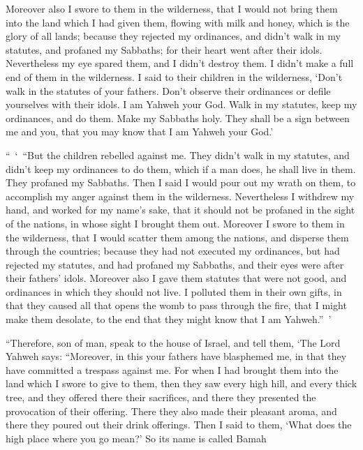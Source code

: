 {Moreover also I swore to them in the wilderness, that I would not bring them into the land which I had given them, flowing with milk and honey, which is the glory of all lands;
because they rejected my ordinances, and didn’t walk in my statutes, and profaned my Sabbaths; for their heart went after their idols.
Nevertheless my eye spared them, and I didn’t destroy them. I didn’t make a full end of them in the wilderness.
I said to their children in the wilderness, ‘Don’t walk in the statutes of your fathers. Don’t observe their ordinances or defile yourselves with their idols.
I am Yahweh your God. Walk in my statutes, keep my ordinances, and do them.
Make my Sabbaths holy. They shall be a sign between me and you, that you may know that I am Yahweh your God.’
\par }{\PP {}“ ‘ “But the children rebelled against me. They didn’t walk in my statutes, and didn’t keep my ordinances to do them, which if a man does, he shall live in them. They profaned my Sabbaths. Then I said I would pour out my wrath on them, to accomplish my anger against them in the wilderness.
Nevertheless I withdrew my hand, and worked for my name’s sake, that it should not be profaned in the sight of the nations, in whose sight I brought them out.
Moreover I swore to them in the wilderness, that I would scatter them among the nations, and disperse them through the countries;
because they had not executed my ordinances, but had rejected my statutes, and had profaned my Sabbaths, and their eyes were after their fathers’ idols.
Moreover also I gave them statutes that were not good, and ordinances in which they should not live.
I polluted them in their own gifts, in that they caused all that opens the womb to pass through the fire, that I might make them desolate, to the end that they might know that I am Yahweh.” ’
\par }{\PP {}“Therefore, son of man, speak to the house of Israel, and tell them, ‘The Lord Yahweh says: “Moreover, in this your fathers have blasphemed me, in that they have committed a trespass against me.
For when I had brought them into the land which I swore to give to them, then they saw every high hill, and every thick tree, and they offered there their sacrifices, and there they presented the provocation of their offering. There they also made their pleasant aroma, and there they poured out their drink offerings.
Then I said to them, ‘What does the high place where you go mean?’ So its name is called Bamah}
